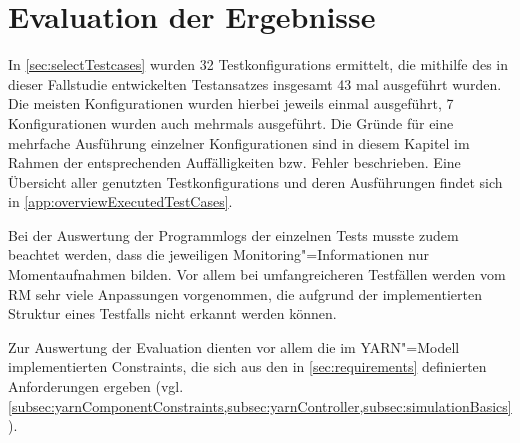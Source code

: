 \chapter{Evaluation der Ergebnisse}
\label{ch:evaluationResults}

In \cref{sec:selectTestcases} wurden 32 \glspl{Testkonfiguration} ermittelt, die mithilfe des in dieser Fallstudie entwickelten Testansatzes insgesamt 43 mal ausgeführt wurden.
Die meisten Konfigurationen wurden hierbei jeweils einmal ausgeführt, 7 Konfigurationen wurden auch mehrmals ausgeführt.
Die Gründe für eine mehrfache Ausführung einzelner Konfigurationen sind in diesem Kapitel im Rahmen der entsprechenden Auffälligkeiten bzw. Fehler beschrieben.
Eine Übersicht aller genutzten \glspl{Testkonfiguration} und deren Ausführungen findet sich in \cref{app:overviewExecutedTestCases}.

Bei der Auswertung der Programmlogs der einzelnen \glspl{Test} musste zudem beachtet werden, dass die jeweiligen Monitoring"=Informationen nur Momentaufnahmen bilden.
Vor allem bei umfangreicheren Testfällen werden vom \gls{RM} sehr viele Anpassungen vorgenommen, die aufgrund der implementierten Struktur eines Testfalls nicht erkannt werden können.

Zur Auswertung der Evaluation dienten vor allem die im \gls{YARN}"=Modell implementierten Constraints, die sich aus den in \cref{sec:requirements} definierten Anforderungen ergeben (vgl. \cref{subsec:yarnComponentConstraints,subsec:yarnController,subsec:simulationBasics}).
















